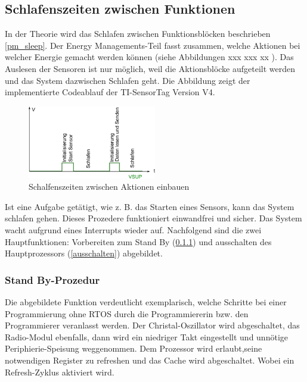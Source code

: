 \subsection{Schlafenszeiten zwischen Funktionen}
\label{sleep_funktion}

In der Theorie wird das Schlafen zwischen Funktionsblöcken beschrieben \ref{pm_sleep}. Der Energy Managements-Teil fasst zusammen, welche Aktionen bei welcher Energie gemacht werden können (siehe Abbildungen xxx  xxx xx ). Das Auslesen der Sensoren ist nur möglich, weil die Aktionsblöcke aufgeteilt werden und das System dazwischen Schlafen geht. Die Abbildung zeigt der implementierte Codeablauf der TI-SensorTag Version V4.

\begin{figure}[ht]
  \includegraphics[width=0.5\textwidth]{3Vorgehen/imag/schlafen_funktionen.png}
  \caption{Schalfenszeiten zwischen Aktionen einbauen}
  \label{warten_zw_bloecken}
\end{figure}

Ist eine Aufgabe getätigt, wie z. B. das Starten eines Sensors, kann das System schlafen gehen. Dieses Prozedere funktioniert einwandfrei und sicher. Das System wacht aufgrund eines Interrupts wieder auf. Nachfolgend sind die zwei Hauptfunktionen: Vorbereiten zum Stand By (\ref{vorbereiten}) und ausschalten des Hauptprozessors (\ref{ausschalten}) abgebildet.

\subsubsection{Stand By-Prozedur}
\label{vorbereiten}

Die abgebildete Funktion verdeutlicht exemplarisch, welche Schritte bei einer Programmierung ohne RTOS durch die Programmiererin bzw. den Programmierer veranlasst werden. Der Christal-Oszillator wird abgeschaltet, das Radio-Modul ebenfalls, dann wird ein niedriger Takt eingestellt und unnötige Periphierie-Speisung weggenommen. Dem Prozessor wird erlaubt,seine notwendigen Register zu refreshen und das Cache wird abgeschaltet. Wobei ein Refresh-Zyklus aktiviert wird.

